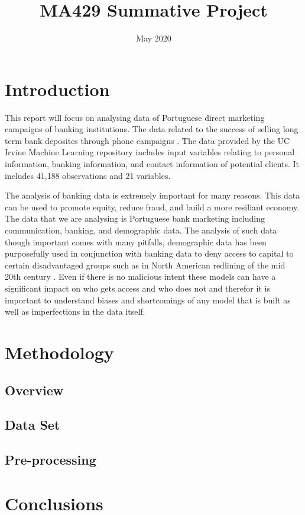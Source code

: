 \documentclass[a4paper, oneside, 11pt]{article}
\title{MA429 Summative Project}
\author{}
\date{May 2020}
\begin{document}
\maketitle

\section{Introduction}
This report will focus on analysing data of Portuguese direct marketing campaigns of banking institutions. The data related to the success of selling long term bank deposites through phone campaigns \cite{moro_data-driven_2014}. The data provided by the UC Irvine Machine Learning repository includes input variables relating to personal information, banking information, and contact information of potential clients. It includes 41,188 observations and 21 variables.

The analysis of banking data is extremely important for many reasons. This data can be used to promote equity, reduce fraud, and build a more resiliant economy. The data that we are analysing is Portuguese bank marketing including communication, banking, and demographic data. The analysis of such data though important comes with many pitfalls, demographic data has been purposefully used in conjunction with banking data to deny access to capital to certain disadvantaged groups such as in North American redlining of the mid 20th century \cite{harris_suburban_2003}. Even if there is no malicious intent these models can have a significant impact on who gets access and who does not and therefor it is important to understand biases and shortcomings of any model that is built as well as imperfections in the data itself.



\section{Methodology}
\subsection{Overview}


\subsection{Data Set}

\subsection{Pre-processing}


\section{Conclusions}




\end{document}
